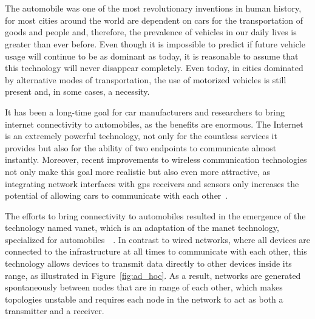 
%

\chapter[Vehicular Ad hoc Networks]{} %
\label{cha:vehicular_networks}

The automobile was one of the most revolutionary inventions in human history, for most cities around the world are dependent on cars for the transportation of goods and people and, therefore, the prevalence of vehicles in our daily lives is greater than ever before. Even though it is impossible to predict if future vehicle usage will continue to be as dominant as today, it is reasonable to assume that this technology will never disappear completely. Even today, in cities dominated by alternative modes of transportation, the use of motorized vehicles is still present and, in some cases, a necessity.

It has been a long-time goal for car manufacturers and researchers to bring internet connectivity to automobiles, as the benefits are enormous. The Internet is an extremely powerful technology, not only for the countless services it provides but also for the ability of two endpoints to communicate almost instantly. Moreover, recent improvements to wireless communication technologies not only make this goal more realistic but also even more attractive, as integrating network interfaces with \gls{gps} receivers and sensors only increases the potential of allowing cars to communicate with each other~\cite{jakubiak_state_2008}.

The efforts to bring connectivity to automobiles resulted in the emergence of the technology named \gls{vanet}, which is an adaptation of the \gls{manet} technology, specialized for automobiles~\cite{al-sultan_comprehensive_2014}~\cite{liang_vehicular_2015}. In contrast to wired networks, where all devices are connected to the infrastructure at all times to communicate with each other, this technology allows devices to transmit data directly to other devices inside its range, as illustrated in Figure~\ref{fig:ad_hoc}. As a result, networks are generated spontaneously between nodes that are in range of each other, which makes topologies unstable and requires each node in the network to act as both a transmitter and a receiver. 

